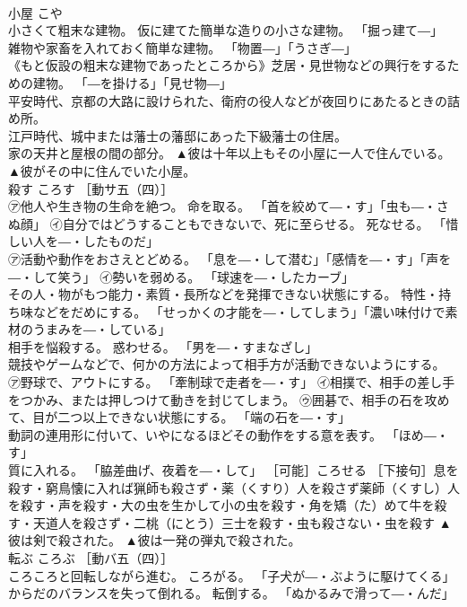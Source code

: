 \documentclass[8pt]{extreport}
\begin{document}
\begin{CJK}{UTF8}{min}
\\	小屋	こや	
\\	小さくて粗末な建物。 仮に建てた簡単な造りの小さな建物。 「掘っ建て―」 
\\	雑物や家畜を入れておく簡単な建物。 「物置―」「うさぎ―」 
\\	《もと仮設の粗末な建物であったところから》芝居・見世物などの興行をするための建物。 「―を掛ける」「見せ物―」 
\\	平安時代、京都の大路に設けられた、衛府の役人などが夜回りにあたるときの詰め所。 
\\	江戸時代、城中または藩士の藩邸にあった下級藩士の住居。 
\\	家の天井と屋根の間の部分。	▲彼は十年以上もその小屋に一人で住んでいる。 ▲彼がその中に住んでいた小屋。
\\	殺す	ころす	［動サ五（四）］ 
\\	㋐他人や生き物の生命を絶つ。 命を取る。 「首を絞めて―・す」「虫も―・さぬ顔」 ㋑自分ではどうすることもできないで、死に至らせる。 死なせる。 「惜しい人を―・したものだ」 
\\	㋐活動や動作をおさえとどめる。 「息を―・して潜む」「感情を―・す」「声を―・して笑う」 ㋑勢いを弱める。 「球速を―・したカーブ」 
\\	その人・物がもつ能力・素質・長所などを発揮できない状態にする。 特性・持ち味などをだめにする。 「せっかくの才能を―・してしまう」「濃い味付けで素材のうまみを―・している」 
\\	相手を悩殺する。 惑わせる。 「男を―・すまなざし」 
\\	競技やゲームなどで、何かの方法によって相手方が活動できないようにする。 ㋐野球で、アウトにする。 「牽制球で走者を―・す」 ㋑相撲で、相手の差し手をつかみ、または押しつけて動きを封じてしまう。 ㋒囲碁で、相手の石を攻めて、目が二つ以上できない状態にする。 「端の石を―・す」 
\\	動詞の連用形に付いて、いやになるほどその動作をする意を表す。 「ほめ―・す」 
\\	質に入れる。 「脇差曲げ、夜着を―・して」 ［可能］ころせる ［下接句］息を殺す・窮鳥懐に入れば猟師も殺さず・薬（くすり）人を殺さず薬師（くすし）人を殺す・声を殺す・大の虫を生かして小の虫を殺す・角を矯（た）めて牛を殺す・天道人を殺さず・二桃（にとう）三士を殺す・虫も殺さない・虫を殺す	▲彼は剣で殺された。 ▲彼は一発の弾丸で殺された。
\\	転ぶ	ころぶ	［動バ五（四）］ 
\\	ころころと回転しながら進む。 ころがる。 「子犬が―・ぶように駆けてくる」 
\\	からだのバランスを失って倒れる。 転倒する。 「ぬかるみで滑って―・んだ」 

\end{CJK}
\end{document}
